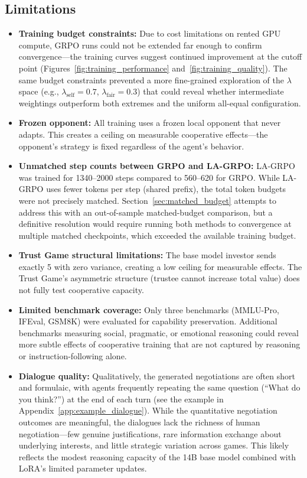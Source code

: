 \documentclass[12pt,a4paper]{article}
\begin{document}
\subsection{Limitations}

\begin{itemize}
    \item \textbf{Training budget constraints:} Due to cost limitations on rented GPU compute, GRPO runs could not be extended far enough to confirm convergence---the training curves suggest continued improvement at the cutoff point (Figures~\ref{fig:training_performance} and~\ref{fig:training_quality}). The same budget constraints prevented a more fine-grained exploration of the $\lambda$ space (e.g., $\lambda_{\text{self}} = 0.7$, $\lambda_{\text{fair}} = 0.3$) that could reveal whether intermediate weightings outperform both extremes and the uniform all-equal configuration.

    \item \textbf{Frozen opponent:} All training uses a frozen local opponent that never adapts. This creates a ceiling on measurable cooperative effects---the opponent's strategy is fixed regardless of the agent's behavior.

    \item \textbf{Unmatched step counts between GRPO and LA-GRPO:} LA-GRPO was trained for 1340--2000 steps compared to 560--620 for GRPO. While LA-GRPO uses fewer tokens per step (shared prefix), the total token budgets were not precisely matched. Section~\ref{sec:matched_budget} attempts to address this with an out-of-sample matched-budget comparison, but a definitive resolution would require running both methods to convergence at multiple matched checkpoints, which exceeded the available training budget.

    \item \textbf{Trust Game structural limitations:} The base model investor sends exactly 5 with zero variance, creating a low ceiling for measurable effects. The Trust Game's asymmetric structure (trustee cannot increase total value) does not fully test cooperative capacity.

    \item \textbf{Limited benchmark coverage:} Only three benchmarks (MMLU-Pro, IFEval, GSM8K) were evaluated for capability preservation. Additional benchmarks measuring social, pragmatic, or emotional reasoning could reveal more subtle effects of cooperative training that are not captured by reasoning or instruction-following alone.

    \item \textbf{Dialogue quality:} Qualitatively, the generated negotiations are often short and formulaic, with agents frequently repeating the same question (``What do you think?'') at the end of each turn (see the example in Appendix~\ref{app:example_dialogue}). While the quantitative negotiation outcomes are meaningful, the dialogues lack the richness of human negotiation---few genuine justifications, rare information exchange about underlying interests, and little strategic variation across games. This likely reflects the modest reasoning capacity of the 14B base model combined with LoRA's limited parameter updates.
\end{itemize}
\end{document}
